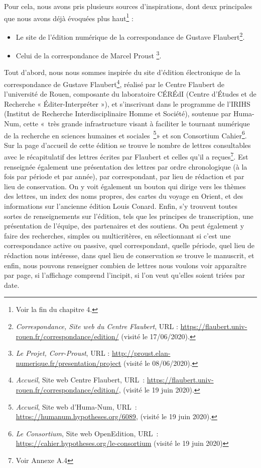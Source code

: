 Pour cela, nous avons pris plusieurs sources d'inspirations, dont deux principales que nous avons déjà évoquées plus haut\footnote{Voir la fin du chapitre 4.} : 
\begin{itemize}
    \item Le site de l'édition numérique de la correspondance de Gustave Flaubert\footnote{\emph{Correspondance, Site web du Centre Flaubert}, URL : \url{https://flaubert.univ-rouen.fr/correspondance/edition/} (visité le 17/06/2020).}.
    \item Celui de la correspondance de Marcel Proust \footnote{\emph{Le Projet, Corr-Proust}, URL : \url{http://proust.elan-numerique.fr/presentation/project} (visité le 08/06/2020).}.
\end{itemize}

Tout d'abord, nous nous sommes inspirée du site d’édition électronique de la correspondance de Gustave Flaubert\footnote{\emph{Accueil}, Site web Centre Flaubert, URL : \url{https://flaubert.univ-rouen.fr/correspondance/edition/}, (visité le 19 juin 2020).}, réalisé par le Centre Flaubert de l’université de Rouen, composante du laboratoire CÉRÉdI (Centre d’Études et de Recherche « Éditer-Interpréter »), et s’inscrivant dans le programme de l’IRIHS (Institut de Recherche Interdisciplinaire Homme et Société), soutenue par Huma-Num, cette « très grande infrastructure visant à faciliter le tournant numérique de la recherche en sciences humaines et sociales \footnote{\emph{Accueil}, Site web d’Huma-Num, URL : \url{https://humanum.hypotheses.org/6089}, (visité le 19 juin 2020).}» et son Consortium Cahier\footnote{\emph{Le Consortium}, Site web OpenEdition, URL : \url{https://cahier.hypotheses.org/le-consortium} (visité le 19 juin 2020)}. 
Sur la page d'accueil de cette édition se trouve le nombre de lettres consultables avec le récapitulatif des lettres écrites par Flaubert et celles qu’il a reçues\footnote{Voir Annexe A.4 }. Est renseignée également une présentation des lettres par ordre chronologique (à la fois par période et par année), par correspondant, par lieu de rédaction et par lieu de conservation. On y voit également un bouton qui dirige vers les thèmes des lettres, un index des noms propres, des cartes du voyage en Orient, et des informations sur l’ancienne édition Louis Conard. Enfin, s’y trouvent toutes sortes de renseignements sur l’édition, tels que les principes de transcription, une présentation de l’équipe, des partenaires et des soutiens. On peut également y faire des recherches, simples ou multicritères, en sélectionnant si c’est une correspondance active ou passive, quel correspondant, quelle période, quel lieu de rédaction nous intéresse, dans quel lieu de conservation se trouve le manuscrit, et enfin, nous pouvons renseigner combien de lettres nous voulons voir apparaître par page, si l’affichage comprend l’incipit, si l’on veut qu’elles soient triées par date.	 

